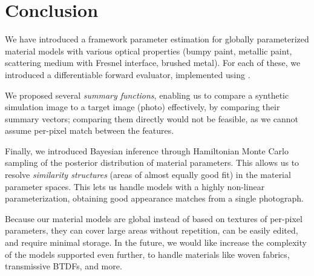 \section{Conclusion}

We have introduced a framework parameter estimation for globally parameterized material models with various optical properties (bumpy paint, metallic paint, scattering medium with Fresnel interface, brushed metal). For each of these, we introduced a differentiable forward evaluator, implemented using \torch.

We proposed several \emph{summary functions}, enabling us to compare a synthetic simulation image to a target image (photo) effectively, by comparing their summary vectors; comparing them directly would not be feasible, as we cannot assume per-pixel match between the features.

Finally, we introduced Bayesian inference through Hamiltonian Monte Carlo sampling of the posterior distribution of material parameters. This allows us to resolve \emph{similarity structures} (areas of almost equally good fit) in the material parameter spaces. This lets us handle models with a highly non-linear parameterization, obtaining good appearance matches from a single photograph.

Because our material models are global instead of based on textures of per-pixel parameters, they can cover large areas without repetition, can be easily edited, and require minimal storage. In the future, we would like increase the complexity of the models supported even further, to handle materials like woven fabrics, transmissive BTDFs, and more.
